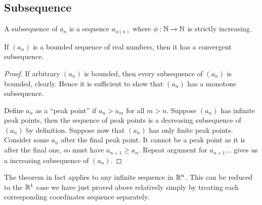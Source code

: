 \documentclass[11pt]{article}
\begin{document}
\subsection{Subsequence}
\begin{definition}[Subsequence]
  A subsequence of \(a_n\) is a sequence \(a_{\phi(n)}\) where \(\phi:\mathbb{N}\to\mathbb{N}\) is strictly increasing.
\end{definition}

\begin{theorem}
  If \((a_n)\) is a bounded sequence of real numbers, then it has a convergent subsequence.
\end{theorem}
\begin{proof}
  If arbitrary \((a_n)\) is bounded, then every subsequence of \((a_n)\) is bounded, clearly. Hence it is sufficient to show that \((a_n)\) has a monotone subsequence.

  Define \(a_n\) as a ``peak point'' if \(a_n>a_m\) for all \(m>n\). Suppose \((a_n)\) has infinite peak points, then the sequence of peak points is a decreasing subsequence of \((a_n)\) by definition. Suppose now that \((a_n)\) has only finite peak points. Consider some \(a_n\) after the final peak point. It cannot be a peak point as it is after the final one, so must have \(a_{n+1}\geq a_n\). Repeat argument for \(a_{n+1}...\) gives us a increasing subsequence of \((a_n)\).
\end{proof}
\begin{remark}
  The theorem in fact applies to any infinite sequence in \(\mathbb{R}^n\). This can be reduced to the \(\mathbb{R}^1\) case we have just proved above relatively simply by treating each corresponding coordinates sequence separately.
\end{remark}
\end{document}
